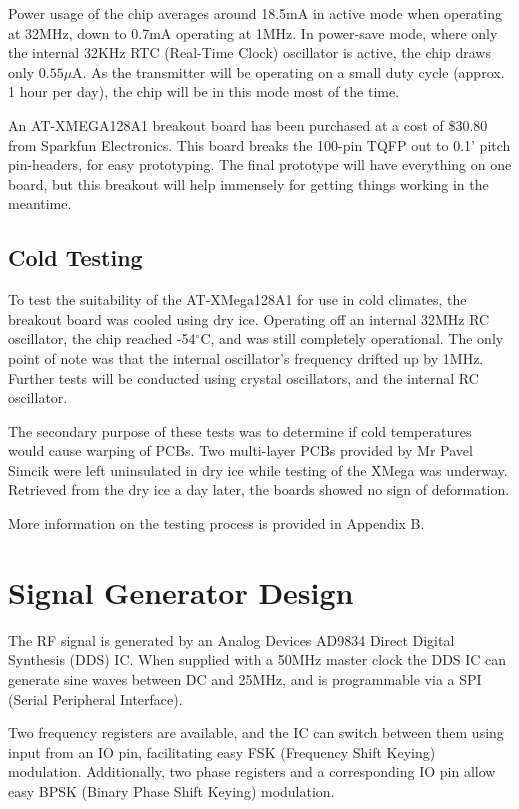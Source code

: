 \documentclass[a4paper,12pt]{article}
\begin{document}
Power usage of the chip averages around 18.5mA in active mode when operating at 32MHz, down to 0.7mA  operating at 1MHz. In power-save mode, where only the internal 32KHz RTC (Real-Time Clock) oscillator is active, the chip draws only $0.55\mu$A. As the transmitter will be operating on a small duty cycle (approx. 1 hour per day), the chip will be in this mode most of the time.

An AT-XMEGA128A1 breakout board has been purchased at a cost of \$30.80 from Sparkfun Electronics. This board breaks the 100-pin TQFP out to 0.1' pitch pin-headers, for easy prototyping. The final prototype will have everything on one board, but this breakout will help immensely for getting things working in the meantime.

\subsection{Cold Testing}
\label{coldtest}
To test the suitability of the AT-XMega128A1 for use in cold climates, the breakout board was cooled using dry ice. Operating off an internal 32MHz RC oscillator, the chip reached -54$^\circ$C, and was still completely operational. The only point of note was that the internal oscillator's frequency drifted up by 1MHz. Further tests will be conducted using crystal oscillators, and the internal RC oscillator.

The secondary purpose of these tests was to determine if cold temperatures would cause warping of PCBs. Two multi-layer PCBs provided by Mr Pavel Simcik were left uninsulated in dry ice while testing of the XMega was underway. Retrieved from the dry ice a day later, the boards showed no sign of deformation.

More information on the testing process is provided in Appendix B.

\section{Signal Generator Design}
The RF signal is generated by an Analog Devices AD9834 Direct Digital Synthesis (DDS) IC. When supplied with a 50MHz master clock the DDS IC can generate sine waves between DC and 25MHz, and is programmable via a SPI (Serial Peripheral Interface). 

Two frequency registers are available, and the IC can switch between them using input from an IO pin, facilitating easy FSK (Frequency Shift Keying) modulation. Additionally, two phase registers and a corresponding IO pin allow easy BPSK (Binary Phase Shift Keying) modulation. 
\end{document}

